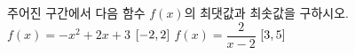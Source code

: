 주어진 구간에서 다음 함수 $f(x)$의 최댓값과 최솟값을 구하시오.
 $f(x)=-x^2+2x+3$ \quad $[-2{,}\mkern3mu\mathopen{}2]$
 $f(x)=\dfrac{2}{x-2}$ \quad $[3{,}\mkern3mu\mathopen{}5]$
